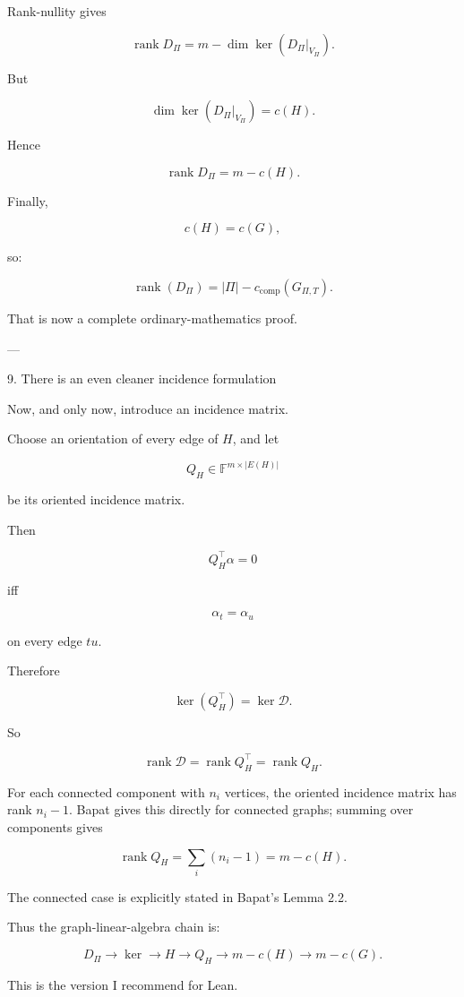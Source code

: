 Rank-nullity gives

\[
\operatorname{rank}D_\Pi
=
m-\dim\ker(D_\Pi|_{V_\Pi}).
\]

But

\[
\dim\ker(D_\Pi|_{V_\Pi})
=
c(H).
\]

Hence

\[
\operatorname{rank}D_\Pi
=
m-c(H).
\]

Finally,

\[
c(H)=c(G),
\]

so:

\[
\boxed{
\operatorname{rank}(D_\Pi)
=
|\Pi|-c_{\mathrm{comp}}(G_{\Pi,T}).
}
\]

That is now a complete ordinary-mathematics proof.


---

9. There is an even cleaner incidence formulation

Now, and only now, introduce an incidence matrix.

Choose an orientation of every edge of \(H\), and let

\[
Q_H\in\mathbb F^{m\times |E(H)|}
\]

be its oriented incidence matrix.

Then

\[
Q_H^\top\alpha=0
\]

iff

\[
\alpha_t=\alpha_u
\]

on every edge \(tu\).

Therefore

\[
\boxed{
\ker(Q_H^\top)=\ker\mathcal D.
}
\]

So

\[
\operatorname{rank}\mathcal D
=
\operatorname{rank}Q_H^\top
=
\operatorname{rank}Q_H.
\]

For each connected component with \(n_i\) vertices, the oriented incidence matrix has rank \(n_i-1\). Bapat gives this directly for connected graphs; summing over components gives

\[
\operatorname{rank}Q_H
=
\sum_i(n_i-1)
=
m-c(H).
\]

The connected case is explicitly stated in Bapat's Lemma 2.2. 

Thus the graph-linear-algebra chain is:

\[
\boxed{
D_\Pi
\longrightarrow
\ker
\longrightarrow
H
\longrightarrow
Q_H
\longrightarrow
m-c(H)
\longrightarrow
m-c(G).
}
\]

This is the version I recommend for Lean.


